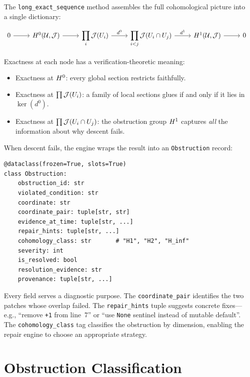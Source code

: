 \documentclass[11pt]{article}
\begin{document}
The \texttt{long\_exact\_sequence} method assembles the full cohomological
picture into a single dictionary:

\begin{equation}\label{eq:les}
\begin{tikzcd}[column sep=2.5em]
0 \ar[r] &
\Hcoh{0}(\mathcal{U}, \J) \ar[r] &
\displaystyle\prod_i \J(U_i) \ar[r, "d^0"] &
\displaystyle\prod_{i<j} \J(U_i \cap U_j) \ar[r, "d^1"] &
\Hcoh{1}(\mathcal{U}, \J) \ar[r] &
0
\end{tikzcd}
\end{equation}

\noindent
Exactness at each node has a verification-theoretic meaning:
\begin{itemize}[leftmargin=*]
\item Exactness at $H^{0}$: every global section restricts faithfully.
\item Exactness at $\prod \mathcal{J}(U_i)$: a family of local sections glues if
  and only if it lies in $\ker(d^0)$.
\item Exactness at $\prod \mathcal{J}(U_i \cap U_j)$: the obstruction group
  $H^{1}$ captures \emph{all} the information about why descent fails.
\end{itemize}

\noindent
When descent fails, the engine wraps the result into an \texttt{Obstruction}
record:

\begin{lstlisting}[caption={Obstruction record.},label={lst:obstruction}]
@dataclass(frozen=True, slots=True)
class Obstruction:
    obstruction_id: str
    violated_condition: str
    coordinate: str
    coordinate_pair: tuple[str, str]
    evidence_at_time: tuple[str, ...]
    repair_hints: tuple[str, ...]
    cohomology_class: str       # "H1", "H2", "H_inf"
    severity: int
    is_resolved: bool
    resolution_evidence: str
    provenance: tuple[str, ...]
\end{lstlisting}

Every field serves a diagnostic purpose.  The \texttt{coordinate\_pair}
identifies the two patches whose overlap failed.  The
\texttt{repair\_hints} tuple suggests concrete fixes---e.g., ``remove \texttt{+1}
from line~7'' or ``use \texttt{None} sentinel instead of mutable default''.
The \texttt{cohomology\_class} tag classifies the obstruction by dimension,
enabling the repair engine to choose an appropriate strategy.


\section{Obstruction Classification}\label{sec:classification}
\end{document}
